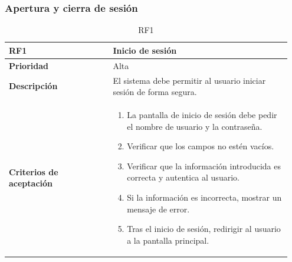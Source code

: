 \subsubsection{Apertura y cierra de sesión}

\begin{table}[htb!]
	\centering %
	\begin{tabular}{|p{0.35\linewidth}|p{0.6\linewidth}|}
		\hline
		\rowcolor{grayshade} \textbf{RF1} & \textbf{Inicio de sesión} \\
		\hline
		\textbf{Prioridad} & Alta \\
		\hline
		\textbf{Descripción} & El sistema debe permitir al usuario iniciar sesión de forma segura.  \\
		\hline
		\vspace{0.5mm}
		\textbf{Criterios de aceptación} & 
		\begin{minipage}[t]{0.9\linewidth}
			\begin{enumerate}
				\item La pantalla de inicio de sesión debe pedir el nombre de usuario y la contraseña.
				\item Verificar que los campos no estén vacíos.
				\item Verificar que la información introducida es correcta y autentica al usuario.
				\item Si la información es incorrecta, mostrar un mensaje de error.
				\item Tras el inicio de sesión, redirigir al usuario a la pantalla principal.
			\end{enumerate}
			\vspace{2mm}
		\end{minipage} \\
		\hline
	\end{tabular}
	\caption{RF1}
\end{table}

\newpage

